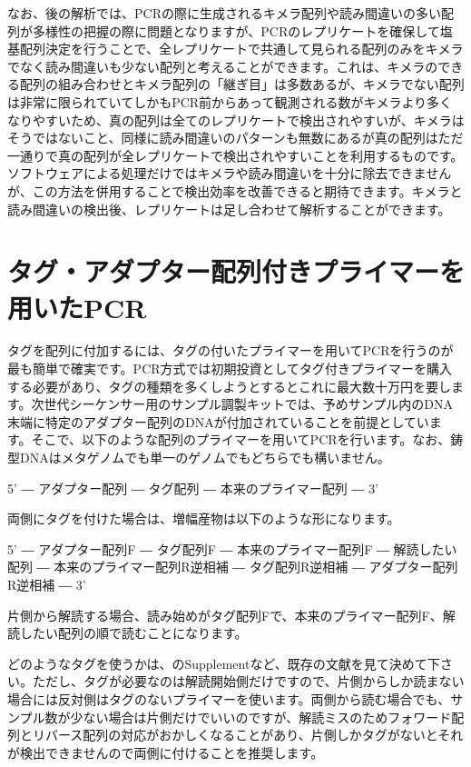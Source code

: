 \documentclass[titlepage,10pt,a4paper]{jsbook}
\newenvironment{pre}{\begin{leftbar}\raggedright\ttfamily\footnotesize\setlength{\baselineskip}{1.4em}}{\end{leftbar}\vspace{-1em}}
\begin{document}
なお、後の解析では、PCRの際に生成されるキメラ配列や読み間違いの多い配列が多様性の把握の際に問題となりますが、PCRのレプリケートを確保して塩基配列決定を行うことで、全レプリケートで共通して見られる配列のみをキメラでなく読み間違いも少ない配列と考えることができます。これは、キメラのできる配列の組み合わせとキメラ配列の「継ぎ目」は多数あるが、キメラでない配列は非常に限られていてしかもPCR前からあって観測される数がキメラより多くなりやすいため、真の配列は全てのレプリケートで検出されやすいが、キメラはそうではないこと、同様に読み間違いのパターンも無数にあるが真の配列はただ一通りで真の配列が全レプリケートで検出されやすいことを利用するものです。ソフトウェアによる処理だけではキメラや読み間違いを十分に除去できませんが、この方法を併用することで検出効率を改善できると期待できます。キメラと読み間違いの検出後、レプリケートは足し合わせて解析することができます。

\section{タグ・アダプター配列付きプライマーを用いたPCR}

タグを配列に付加するには、タグの付いたプライマーを用いてPCRを行うのが最も簡単で確実です。PCR方式では初期投資としてタグ付きプライマーを購入する必要があり、タグの種類を多くしようとするとこれに最大数十万円を要します。次世代シーケンサー用のサンプル調製キットでは、予めサンプル内のDNA末端に特定のアダプター配列のDNAが付加されていることを前提としています。そこで、以下のような配列のプライマーを用いてPCRを行います。なお、鋳型DNAはメタゲノムでも単一のゲノムでもどちらでも構いません。
\begin{pre}
5' ― アダプター配列 ― タグ配列 ― 本来のプライマー配列 ― 3'
\end{pre}
両側にタグを付けた場合は、増幅産物は以下のような形になります。
\begin{pre}
5' ― アダプター配列F ― タグ配列F ― 本来のプライマー配列F ― 解読したい配列 ― 本来のプライマー配列R逆相補 ― タグ配列R逆相補 ― アダプター配列R逆相補 ― 3'
\end{pre}
片側から解読する場合、読み始めがタグ配列Fで、本来のプライマー配列F、解読したい配列の順で読むことになります。

どのようなタグを使うかは、\citet{Hamady2008}のSupplementなど、既存の文献を見て決めて下さい。ただし、タグが必要なのは解読開始側だけですので、片側からしか読まない場合には反対側はタグのないプライマーを使います。両側から読む場合でも、サンプル数が少ない場合は片側だけでいいのですが、解読ミスのためフォワード配列とリバース配列の対応がおかしくなることがあり、片側しかタグがないとそれが検出できませんので両側に付けることを推奨します。
\end{document}
